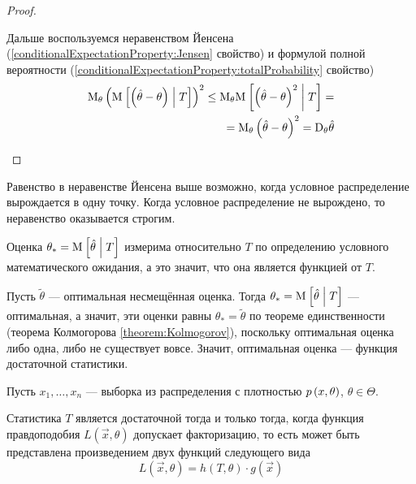 \begin{proof}
\begin{enumerate}
            Дальше воспользуемся неравенством Йенсена
            (\ref{conditionalExpectationProperty:Jensen} свойство)
            и формулой полной вероятности
            (\ref{conditionalExpectationProperty:totalProbability} свойство)
            \begin{align*}
                \mathrm{M}_{\theta} \left( \mathrm{M}_{} \left[ \left( \hat{\theta}
                        - \theta \right) \;\middle|\; T \right]\right)^2
                    \le \mathrm{M}_{\theta} \mathrm{M}_{} \left[ \left( \hat{\theta}
                        - \theta \right)^2 \;\middle|\; T \right] = \\
                    = \mathrm{M}_{\theta} \left( \hat{\theta} -\theta \right)^2
                    = \mathrm{D}_{\theta} \hat{\theta}
            \end{align*}
    \end{enumerate}
\end{proof}

\begin{remark}
    Равенство в неравенстве Йенсена выше возможно,
    когда условное распределение вырождается в одну точку.
    Когда условное распределение не вырождено,
    то неравенство оказывается строгим.
\end{remark}

\begin{remark}
    Оценка $\theta_* = \mathrm{M}_{} \left[ \hat{\theta} \;\middle|\; T \right]$ измерима относительно $T$
    по определению условного математического ожидания, а это значит,
    что она является функцией от $T$.

    Пусть $\tilde{\theta}$ --- оптимальная несмещённая оценка.
    Тогда $\theta_* = \mathrm{M}_{} \left[ \hat{\theta} \;\middle|\; T \right]$ --- оптимальная, а значит,
    эти оценки равны $\theta_* = \tilde{\theta}$ по теореме единственности
    (теорема Колмогорова \ref{theorem:Kolmogorov}),
    поскольку оптимальная оценка либо одна, либо не существует вовсе.
    Значит, оптимальная оценка --- функция достаточной статистики.
\end{remark}

\begin{theorem}
    Пусть $x_1, \dots, x_n$ --- выборка из распределения
    с плотностью $p\left(x,\theta\right)$, $\theta \in \Theta$.

    Статистика $T$ является достаточной тогда и только тогда, когда
    функция правдоподобия $L\left( \vec{x}, \theta \right)$
    допускает факторизацию, то есть может быть представлена
    произведением двух функций следующего вида
    $$L\left( \vec{x}, \theta \right)
        = h\left( T, \theta \right) \cdot g\left( \vec{x} \right)$$
\end{theorem}

